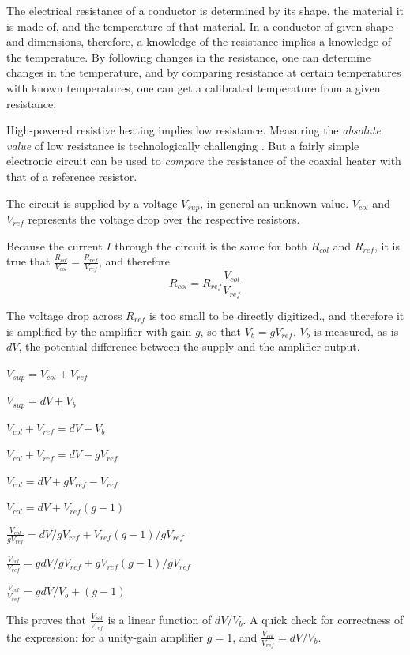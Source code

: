 The electrical resistance of a conductor is determined by its shape, the
material it is made of, and the temperature of that material. In a conductor of
given shape and dimensions, therefore, a knowledge of the resistance implies a
knowledge of the temperature. By following changes in the resistance, one can
determine changes in the temperature, and by comparing resistance at certain
temperatures with known temperatures, one can get a calibrated temperature from
a given resistance.

High-powered resistive heating implies low resistance. Measuring the
\textit{absolute value} of low resistance is technologically challenging . But a fairly simple
electronic circuit can be used to \textit{compare} the resistance of the coaxial
heater with that of a reference resistor.

The circuit is supplied by a voltage $V_{sup}$, in general an unknown value.
$V_{col}$ and $V_{ref}$ represents the voltage drop over the respective
resistors.

Because the current $I$ through the circuit is the same for both $R_{col}$ and
$R_{ref}$, it is true that $\frac{R_{col}}{V_{col}}=\frac{R_{ref}}{V_{ref}}$,
and therefore \begin{equation}R_{col} = R_{ref}\frac{V_{col}}{V_{ref}}
\end{equation}

The voltage drop across $R_{ref}$ is too small to be directly digitized., and therefore it is amplified by the
amplifier with gain $g$, so that $V_b = gV_{ref}$. $V_b$ is measured, as is
$dV$, the potential difference between the supply and the amplifier output.

$V_{sup} = V_{col} + V_{ref}$ 

$V_{sup}=dV + V_b$

$V_{col} + V_{ref} = dV + V_b$

$V_{col} + V_{ref} = dV + gV_{ref}$

$V_{col} = dV + gV_{ref} - V_{ref} $

$V_{col} = dV + V_{ref}(g - 1)$

$\frac{\displaystyle V_{col}}{\displaystyle gV_{ref}} = dV/gV_{ref} + V_{ref}(g-1)/gV_{ref}$

$\frac{\displaystyle V_{col}}{\displaystyle V_{ref}} = gdV/gV_{ref} + gV_{ref}(g-1)/gV_{ref}$

$\frac{\displaystyle V_{col}}{\displaystyle V_{ref}} = gdV/V_b + (g-1)$

This proves that $\frac{\displaystyle V_{col}}{\displaystyle V_{ref}}$ is a
linear function of $dV/V_b$. A quick check for correctness of the expression:
for a unity-gain amplifier $g = 1$, and $\frac{\displaystyle
V_{col}}{\displaystyle V_{ref}} = dV/V_b$.


